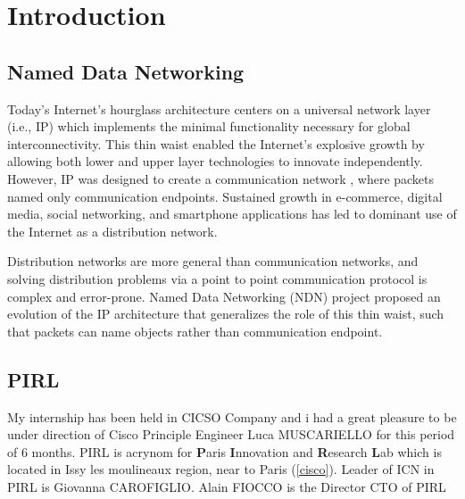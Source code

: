 
\chapter{Introduction} %

\label{Chapter1} %


\section{Named Data Networking}

Today's Internet's hourglass architecture centers on a
universal network layer (i.e., IP) which implements the minimal functionality  necessary  for  global interconnectivity. This thin  waist  enabled  the Internet's  explosive  growth  by  allowing both lower and upper layer technologies to innovate independently.  However, IP was designed to create a communication  network
, where  packets  named  only  communication endpoints.  Sustained growth in e-commerce, digital media, social networking, and smartphone applications has led to dominant use of the Internet as a distribution network.

Distribution networks are more general than communication
networks, and solving distribution problems via a point to point communication protocol is complex and error-prone.
Named Data Networking (NDN) project proposed an
evolution of the IP architecture that generalizes the role of this  thin  waist,  such  that  packets  can  name  objects  rather than  communication  endpoint.

\section{PIRL}

My internship has been held in CICSO Company and i had a great pleasure to be under direction of Cisco Principle Engineer Luca MUSCARIELLO  for this period of 6 months. PIRL is acrynom for \textbf{P}aris \textbf{I}nnovation and \textbf{R}esearch \textbf{L}ab which is located in Issy les moulineaux region, near to Paris (\ref{cisco}). Leader of ICN in PIRL is Giovanna CAROFIGLIO. Alain FIOCCO is the  Director CTO of PIRL


